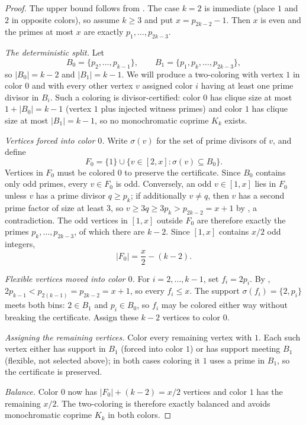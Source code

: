 \documentclass[10pt,a4paper]{amsart}
\begin{document}
\begin{proof}
The upper bound follows from .  The case $k=2$ is immediate
(place $1$ and $2$ in opposite colors), so assume $k\ge3$ and put
$x=p_{2k-2}-1$.  Then $x$ is even and the primes at most $x$ are exactly
$p_1,\ldots,p_{2k-3}$.

\medskip\noindent\textit{The deterministic split.}
Let
\[
  B_0=\{p_2,\ldots,p_{k-1}\},\qquad
  B_1=\{p_1,p_k,\ldots,p_{2k-3}\},
\]
so $|B_0|=k-2$ and $|B_1|=k-1$.  We will produce a two-coloring with vertex
$1$ in color $0$ and with every other vertex $v$ assigned color $i$ having
at least one prime divisor in $B_i$.  Such a coloring is divisor-certified:
color $0$ has clique size at most $1+|B_0|=k-1$ (vertex $1$ plus injected
witness primes) and color $1$ has clique size at most $|B_1|=k-1$, so no
monochromatic coprime $K_k$ exists.

\medskip\noindent\textit{Vertices forced into color $0$.}
Write $\sigma(v)$ for the set of prime divisors of $v$, and define
\[
  F_0=\{1\}\cup\{v\in[2,x]:\sigma(v)\subseteq B_0\}.
\]
Vertices in $F_0$ must be colored $0$ to preserve the certificate.  Since
$B_0$ contains only odd primes, every $v\in F_0$ is odd.  Conversely, an odd
$v\in[1,x]$ lies in $F_0$ unless $v$ has a prime divisor $q\ge p_k$; if
additionally $v\ne q$, then $v$ has a second prime factor of size at least
$3$, so $v\ge 3q\ge 3p_k>p_{2k-2}=x+1$ by , a
contradiction.  The odd vertices in $[1,x]$ outside $F_0$ are therefore
exactly the primes $p_k,\ldots,p_{2k-3}$, of which there are $k-2$.  Since
$[1,x]$ contains $x/2$ odd integers,
\[
  |F_0|=\frac{x}{2}-(k-2).
\]

\medskip\noindent\textit{Flexible vertices moved into color $0$.}
For $i=2,\ldots,k-1$, set $f_i=2p_i$.  By ,
$2p_{k-1}<p_{2(k-1)}=p_{2k-2}=x+1$, so every $f_i\le x$.  The support
$\sigma(f_i)=\{2,p_i\}$ meets both bins: $2\in B_1$ and $p_i\in B_0$, so
$f_i$ may be colored either way without breaking the certificate.  Assign
these $k-2$ vertices to color $0$.

\medskip\noindent\textit{Assigning the remaining vertices.}
Color every remaining vertex with $1$.  Each such vertex either has support
in $B_1$ (forced into color $1$) or has support meeting $B_1$ (flexible,
not selected above); in both cases coloring it $1$ uses a prime in $B_1$,
so the certificate is preserved.

\medskip\noindent\textit{Balance.}
Color $0$ now has $|F_0|+(k-2)=x/2$ vertices and color $1$ has the remaining
$x/2$.  The two-coloring is therefore exactly balanced and avoids
monochromatic coprime $K_k$ in both colors.
\end{proof}
\end{document}
